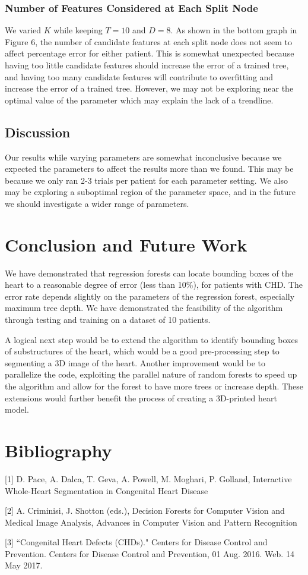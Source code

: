 \subsubsection{Number of Features Considered at Each Split Node} We varied $K$ while keeping $T=10$ and $D=8$. As shown in the bottom graph in Figure 6, the number of candidate features at each split node does not seem to affect percentage error for either patient. This is somewhat unexpected because having too little candidate features should increase the error of a trained tree, and having too many candidate features will contribute to overfitting and increase the error of a trained tree. However, we may not be exploring near the optimal value of the parameter which may explain the lack of a trendline. 

\subsection{Discussion}
Our results while varying parameters are somewhat inconclusive because we expected the parameters to affect the results more than we found. This may be because we only ran 2-3 trials per patient for each parameter setting. We also may be exploring a suboptimal region of the parameter space, and in the future we should investigate a wider range of parameters.

\section{Conclusion and Future Work}
We have demonstrated that regression forests can locate bounding boxes of the heart to a reasonable degree of error (less than 10\%), for patients with CHD. The error rate depends slightly on the parameters of the regression forest, especially maximum tree depth. We have demonstrated the feasibility of the algorithm through testing and training on a dataset of 10 patients.

A logical next step would be to extend the algorithm to identify bounding boxes of substructures of the heart, which would be a good pre-processing step to segmenting a 3D image of the heart. Another improvement would be to parallelize the code, exploiting the parallel nature of random forests to speed up the algorithm and allow for the forest to have more trees or increase depth. These extensions would further benefit the process of creating a 3D-printed heart model.

\section{Bibliography}
[1] D. Pace, A. Dalca, T. Geva, A. Powell, M. Moghari, P. Golland, Interactive Whole-Heart Segmentation in Congenital Heart Disease

[2] A. Criminisi, J. Shotton (eds.), Decision Forests for Computer Vision and Medical Image Analysis, Advances in Computer Vision and Pattern Recognition

[3] ``Congenital Heart Defects (CHDs)." Centers for Disease Control and Prevention. Centers for Disease Control and Prevention, 01 Aug. 2016. Web. 14 May 2017.

